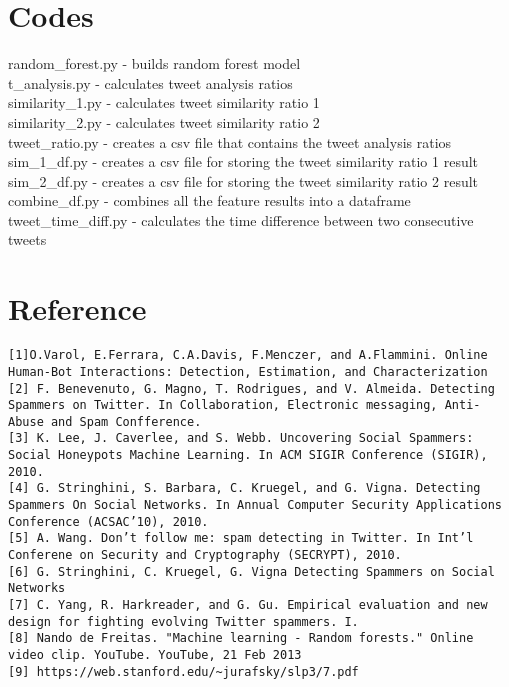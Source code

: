 \documentclass[a4paper, 12pt]{report}
\begin{document}
\newpage
\section*{Codes}
random\_forest.py - builds random forest model\\
t\_analysis.py - calculates tweet analysis ratios\\
similarity\_1.py - calculates tweet similarity ratio 1\\
similarity\_2.py - calculates tweet similarity ratio 2\\
tweet\_ratio.py - creates a csv file that contains the tweet analysis ratios\\
sim\_1\_df.py - creates a csv file for storing the tweet similarity ratio 1 result\\
sim\_2\_df.py - creates a csv file for storing the tweet similarity ratio 2 result\\
combine\_df.py - combines all the feature results into a dataframe\\
tweet\_time\_diff.py - calculates the time difference between two consecutive tweets\\


\newpage
\section*{Reference}
\begin{lstlisting}
[1]O.Varol, E.Ferrara, C.A.Davis, F.Menczer, and A.Flammini. Online Human-Bot Interactions: Detection, Estimation, and Characterization
[2] F. Benevenuto, G. Magno, T. Rodrigues, and V. Almeida. Detecting Spammers on Twitter. In Collaboration, Electronic messaging, Anti-Abuse and Spam Confference.
[3] K. Lee, J. Caverlee, and S. Webb. Uncovering Social Spammers: Social Honeypots Machine Learning. In ACM SIGIR Conference (SIGIR), 2010.
[4] G. Stringhini, S. Barbara, C. Kruegel, and G. Vigna. Detecting Spammers On Social Networks. In Annual Computer Security Applications Conference (ACSAC’10), 2010.
[5] A. Wang. Don’t follow me: spam detecting in Twitter. In Int’l Conferene on Security and Cryptography (SECRYPT), 2010.
[6] G. Stringhini, C. Kruegel, G. Vigna Detecting Spammers on Social Networks
[7] C. Yang, R. Harkreader, and G. Gu. Empirical evaluation and new design for fighting evolving Twitter spammers. I.
[8] Nando de Freitas. "Machine learning - Random forests." Online video clip. YouTube. YouTube, 21 Feb 2013
[9] https://web.stanford.edu/~jurafsky/slp3/7.pdf
 
\end{lstlisting}
\end{document}

